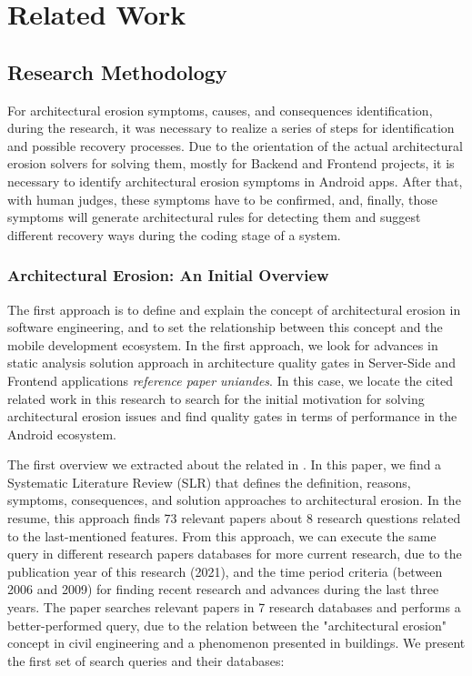 \chapter{Related Work}
\label{cha:relatedwork}

\section{Research Methodology}
For architectural erosion symptoms, causes, and consequences identification, during the research, it was necessary to realize a series of steps for identification and possible recovery processes. Due to the orientation of the actual architectural erosion solvers for solving them, mostly for Backend and Frontend projects, it is necessary to identify architectural erosion symptoms in Android apps. After that, with human judges, these symptoms have to be confirmed, and, finally, those symptoms will generate architectural rules for detecting them and suggest different recovery ways during the coding stage of a system.

\subsection{Architectural Erosion: An Initial Overview}
The first approach is to define and explain the concept of architectural erosion in software engineering, and to set the relationship between this concept and the mobile development ecosystem. In the first approach, we look for advances in static analysis solution approach in architecture quality gates in Server-Side and Frontend applications \emph{reference paper uniandes}. In this case, we locate the cited related work in this research to search for the initial motivation for solving architectural erosion issues and find quality gates in terms of performance in the Android ecosystem.

The first overview we extracted about the related in \citet{slr-base}. In this paper, we find a Systematic Literature Review (SLR) that defines the definition, reasons, symptoms, consequences, and solution approaches to architectural erosion. In the resume, this approach finds 73 relevant papers about 8 research questions related to the last-mentioned features. From this approach, we can execute the same query in different research papers databases for more current research, due to the publication year of this research (2021), and the time period criteria (between 2006 and 2009) for finding recent research and advances during the last three years. The paper searches relevant papers in 7 research databases and performs a better-performed query, due to the relation between the "architectural erosion" concept in civil engineering and a phenomenon presented in buildings. We present the first set of search queries and their databases:

